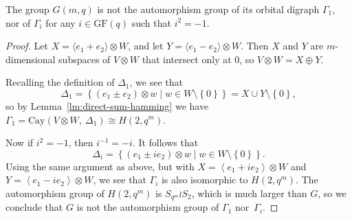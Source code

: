 \documentclass[ALCO, Unicode]{cedram}
\newcommand{\Cay}{\mathrm{Cay}}
\newcommand{\GF}{\mathrm{GF}}
\begin{document}
\begin{lemma} \label{lm:Gamma_1,i}
The group $G{\left(m, q \right)}$ is not the automorphism group of its orbital digraph $\Gamma_1$, nor of $\Gamma_i$ for any $i \in \GF{\left(q \right)}$ such that $i^2 = -1$.
\end{lemma}
\begin{proof}
Let $X = \langle e_1 + e_2 \rangle \otimes W$, and let $Y = \langle e_1 - e_2 \rangle \otimes W$. Then $X$ and $Y$ are $m$-dimensional subspaces of $V \otimes W$ that intersect only at $0$, so $V \otimes W = X \oplus Y$.

Recalling the definition of $\Delta_1$, we see that
\begin{displaymath}
\Delta_1 = \left\{ \left(e_1 \pm e_2 \right) \otimes w \mid w \in W \setminus \left\{0 \right\} \right\} = X \cup Y \setminus {\left\{0 \right\}},
\end{displaymath}
so by Lemma~\ref{lm:direct-sum-hamming} we have $\Gamma_1 = \Cay{\left(V \otimes W,\ \Delta_1 \right)} \cong H{\left(2, q^m \right)}$.

Now if $i^2 = -1$, then $i^{-1} = -i$. It follows that
\begin{displaymath}
\Delta_i = {\left\{\left(e_1 \pm i e_2 \right) \otimes w \mid w \in W \setminus \left\{0 \right\}\right\}}.
\end{displaymath}
Using the same argument as above, but with $X = \left<e_1 + i e_2 \right> \otimes W$ and $Y = \left<e_1 - i e_2 \right> \otimes W$, we see that $\Gamma_i$ is also isomorphic to $H{\left(2, q^m \right)}$. The automorphism group of $H{\left(2, q^m \right)}$ is $S_{q^m} \wr S_2$, which is much larger than $G$, so we conclude that $G$ is not the automorphism group of $\Gamma_1$ nor~$\Gamma_i$.
\end{proof}
\end{document}

